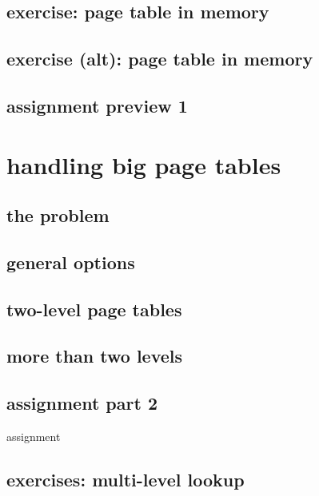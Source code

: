 \subsection{exercise: page table in memory}

\subsection{exercise (alt): page table in memory}


\subsection{assignment preview 1}





\section{handling big page tables}
\subsection{the problem}


\subsection{general options}


\subsection{two-level page tables}




\subsection{more than two levels}


\subsection{assignment part 2}
\begin{frame}{assignment}
\end{frame}

\subsection{exercises: multi-level lookup}
